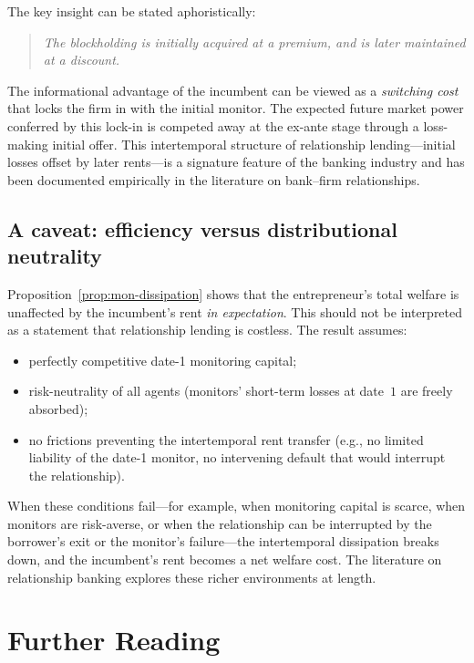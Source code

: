 \documentclass[11pt,a4paper,oneside]{book}
\theoremstyle{plain}
\theoremstyle{definition}
\theoremstyle{remark}
\numberwithin{equation}{chapter}
\begin{document}
The key insight can be stated aphoristically:

\begin{quote}
\emph{The blockholding is initially acquired at a premium, and is later maintained at a discount.}
\end{quote}

The informational advantage of the incumbent can be viewed as a \emph{switching cost} that locks the firm in with the initial monitor.
The expected future market power conferred by this lock-in is competed away at the ex-ante stage through a loss-making initial offer.
This intertemporal structure of relationship lending---initial losses offset by later rents---is a signature feature of the banking industry and has been documented empirically in the literature on bank--firm relationships.

\subsection{A caveat: efficiency versus distributional neutrality}

Proposition~\ref{prop:mon-dissipation} shows that the entrepreneur's total welfare is unaffected by the incumbent's rent \emph{in expectation}.
This should not be interpreted as a statement that relationship lending is costless.
The result assumes:
\begin{itemize}
  \item perfectly competitive date-1 monitoring capital;
  \item risk-neutrality of all agents (monitors' short-term losses at date~$1$ are freely absorbed);
  \item no frictions preventing the intertemporal rent transfer (e.g., no limited liability of the date-1 monitor, no intervening default that would interrupt the relationship).
\end{itemize}
When these conditions fail---for example, when monitoring capital is scarce, when monitors are risk-averse, or when the relationship can be interrupted by the borrower's exit or the monitor's failure---the intertemporal dissipation breaks down, and the incumbent's rent becomes a net welfare cost.
The literature on relationship banking explores these richer environments at length.

\section{Further Reading}
\label{sec:mon-further}
\end{document}
